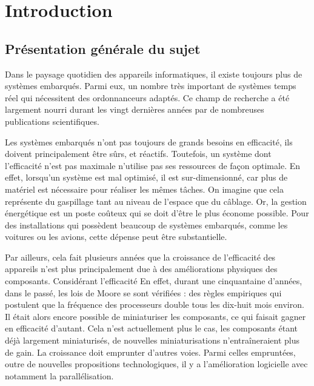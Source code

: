 \documentclass[11pt,a4paper,oneside]{report}
\begin{document}
	
	
	
	\chapter{Introduction}{}
	\setcounter{page}{1}
	
	
	\section{Présentation générale du sujet}
	
	Dans le paysage quotidien des appareils informatiques, il existe toujours plus de systèmes embarqués. 
	Parmi eux, un nombre très important de systèmes temps réel qui 
	nécessitent des ordonnanceurs adaptés. 
	Ce champ de recherche a été largement nourri durant les vingt dernières années par de nombreuses publications scientifiques. \medskip
	
	Les systèmes embarqués n'ont pas toujours de grands besoins en efficacité, 
	ils doivent principalement être sûrs, et réactifs. 
	Toutefois, un système dont l'efficacité n'est pas maximale n'utilise pas 
	ses ressources de façon optimale. En effet, lorsqu'un système est 
	mal optimisé, il est sur-dimensionné, car plus de matériel est nécessaire 
	pour réaliser les mêmes tâches. On imagine que cela représente du 
	gaspillage tant au niveau de l'espace que du câblage. Or, la gestion énergétique 
	est un poste coûteux qui se doit d'être le plus économe possible. 
	Pour des installations qui possèdent beaucoup de systèmes embarqués, comme les voitures ou les avions, 
	cette dépense peut être substantielle. \medskip
	
	Par ailleurs, cela fait plusieurs années que la croissance de l'efficacité des appareils n'est plus 
	principalement due à des améliorations physiques des composants. 
	Considérant l'efficacité 
	En effet, durant une cinquantaine d'années, dans le passé, les lois de Moore
	se sont vérifiées : des règles empiriques qui postulent que la fréquence des processeurs 
	double tous les dix-huit mois environ. 
	Il était alors encore possible de miniaturiser les composants, 
	ce qui faisait gagner en efficacité d'autant. 
	Cela n'est actuellement plus le cas, 
	les composants étant déjà largement miniaturisés, de nouvelles miniaturisations 
	n'entraîneraient plus de gain. La croissance doit emprunter d'autres voies. Parmi celles 
	empruntées, outre de nouvelles propositions technologiques, 
	il y a l'amélioration logicielle avec notamment la parallélisation.
	\medskip
	
\end{document}

